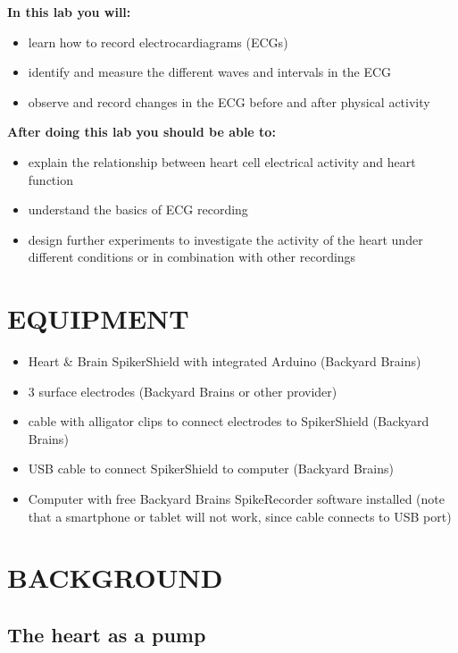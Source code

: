 \documentclass[12pt]{article}
\begin{document}
\vspace{0.3cm}

\textbf{In this lab you will:}
\begin{itemize}
\item learn how to record electrocardiagrams (ECGs)
\item identify and measure the different waves and intervals in the ECG 
\item observe and record changes in the ECG before and after physical activity
\end{itemize}

\vspace{0.3cm}
 
\textbf{After doing this lab you should be able to:}
\begin{itemize}
\item explain the relationship between heart cell electrical activity and heart function
\item understand the basics of ECG recording
\item design further experiments to investigate the activity of the heart under different conditions or in combination with other recordings
\end{itemize}

\section*{EQUIPMENT}

\begin{itemize}
\item Heart \& Brain SpikerShield with integrated Arduino (Backyard Brains)
\item 3 surface electrodes (Backyard Brains or other provider)
\item cable with alligator clips to connect electrodes to SpikerShield (Backyard Brains)
\item USB cable to connect SpikerShield to computer (Backyard Brains)
\item Computer with free Backyard Brains SpikeRecorder software installed (note that a smartphone or tablet will not work, since cable connects to USB port)
\end{itemize}

\section*{BACKGROUND}

\subsection*{The heart as a pump}
\end{document}
